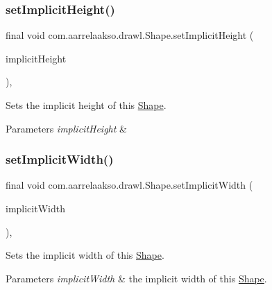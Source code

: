 \subsubsection{\texorpdfstring{set\+Implicit\+Height()}{setImplicitHeight()}}
{\footnotesize\ttfamily final void com.\+aarrelaakso.\+drawl.\+Shape.\+set\+Implicit\+Height (\begin{DoxyParamCaption}\item[{@Not\+Null \hyperlink{classcom_1_1aarrelaakso_1_1drawl_1_1_drawl_number}{Drawl\+Number}}]{implicit\+Height }\end{DoxyParamCaption})\hspace{0.3cm}{\ttfamily [protected]}, {\ttfamily [inherited]}}



Sets the implicit height of this \hyperlink{classcom_1_1aarrelaakso_1_1drawl_1_1_shape}{Shape}. 


\begin{DoxyParams}{Parameters}
{\em implicit\+Height} & \\
\hline
\end{DoxyParams}
\mbox{\label{classcom_1_1aarrelaakso_1_1drawl_1_1_shape_ac513970aed7ea7faa1de7efa35d7d068}} 
\subsubsection{\texorpdfstring{set\+Implicit\+Width()}{setImplicitWidth()}}
{\footnotesize\ttfamily final void com.\+aarrelaakso.\+drawl.\+Shape.\+set\+Implicit\+Width (\begin{DoxyParamCaption}\item[{@Not\+Null \hyperlink{classcom_1_1aarrelaakso_1_1drawl_1_1_drawl_number}{Drawl\+Number}}]{implicit\+Width }\end{DoxyParamCaption})\hspace{0.3cm}{\ttfamily [protected]}, {\ttfamily [inherited]}}



Sets the implicit width of this \hyperlink{classcom_1_1aarrelaakso_1_1drawl_1_1_shape}{Shape}. 


\begin{DoxyParams}{Parameters}
{\em implicit\+Width} & the implicit width of this \hyperlink{classcom_1_1aarrelaakso_1_1drawl_1_1_shape}{Shape}. \\
\hline
\end{DoxyParams}
\mbox{\label{classcom_1_1aarrelaakso_1_1drawl_1_1_shape_a58226399cee0d166f45e807869af0bc8}} 
